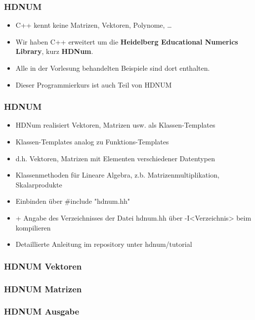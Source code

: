 \begin{frame}[fragile]
\frametitle{HDNUM}
\begin{itemize}
\item C++ kennt keine Matrizen, Vektoren, Polynome, \ldots
\item Wir haben C++ erweitert um die \textbf{Heidelberg Educational
  Numerics Library}, kurz \textbf{HDNum}.
\item Alle in der Vorlesung behandelten Beispiele sind dort
  enthalten.
\item Dieser Programmierkurs ist auch Teil von HDNUM
\end{itemize}
\end{frame}

\begin{frame}[fragile]
\frametitle{HDNUM}
\begin{itemize}
\item HDNum realisiert Vektoren, Matrizen usw. als Klassen-Templates
\item Klassen-Templates analog zu Funktions-Templates
\item d.h. Vektoren, Matrizen mit Elementen verschiedener Datentypen
\item Klassenmethoden für Lineare Algebra, z.b. Matrizenmultiplikation, Skalarprodukte
\item Einbinden über \#include "hdnum.hh"
\item + Angabe des Verzeichnisses der Datei hdnum.hh über -I<Verzeichnis> beim kompilieren
\item Detaillierte Anleitung im repository unter hdnum/tutorial
\end{itemize}
\end{frame}

\begin{frame}[fragile]
\frametitle{HDNUM Vektoren}

\end{frame}

\begin{frame}[fragile]
\frametitle{HDNUM Matrizen}

\end{frame}

\begin{frame}[fragile]
\frametitle{HDNUM Ausgabe}

\end{frame}


